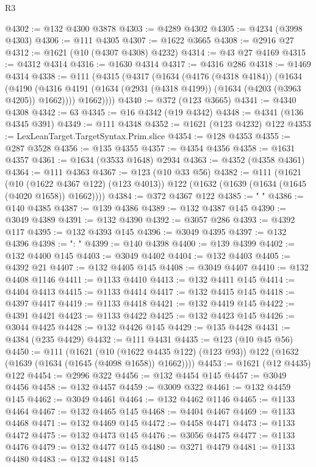 \begin{lexlean}{R3}
\begin{coremodule}
@4302 := @132 @4300 @3878
@4303 := @4289 @4302
@4305 := @4234 (@3998 @4303)
@4306 := @111 @4305
@4307 := @1622 @3665
@4308 := @2916 @27
@4312 := @1621 (@10 (@4307 @4308) @4232)
@4314 := @43 @27 @4169
@4315 := @4312 @4314
@4316 := @1630 @4314
@4317 := @4316 @286
@4318 := @1469 @4314
@4338 := @111
    (@4315
      (@4317
        (@1634
          (@4176 (@4318 @4184))
          (@1634
            (@4190 (@4316 @4191 (@1634 (@2931 (@4318 @4199)) (@1634 (@4203 (@3963 @4205)) @1662))))
            @1662))))
@4340 := @372 (@123 @3665)
@4341 := @4340 @4308
@4342 := 63
@4345 := @16 @4342 (@19 @4342)
@4348 := @4341 (@136 @4345 @391)
@4349 := @111 @4348
@4352 := @1621 (@123 @4232) @122
@4353 := LexLeanTarget.TargetSyntax.Prim.slice
@4354 := @128 @4353
@4355 := @287 @3528
@4356 := @135 @4355
@4357 := @4354 @4356
@4358 := @1631 @4357
@4361 := @1634 (@3533 @1648) @2934
@4363 := @4352 (@4358 @4361)
@4364 := @111 @4363
@4367 := @123 (@10 @33 @56)
@4382 := @111
    (@1621
      (@10 (@1622 @4367 @122) (@123 @4013))
      @122
      (@1632 (@1639 (@1634 (@1645 (@4020 @1658)) @1662))))
@4384 := @372 @4367 @122
@4385 := "      "
@4386 := @140 @4385
@4387 := @139 @4386
@4389 := @132 @4387 @145
@4390 := @3049 @4389
@4391 := @132 @4390
@4392 := @3057 @286
@4393 := @4392 @117
@4395 := @132 @4393 @145
@4396 := @3049 @4395
@4397 := @132 @4396
@4398 := ": "
@4399 := @140 @4398
@4400 := @139 @4399
@4402 := @132 @4400 @145
@4403 := @3049 @4402
@4404 := @132 @4403
@4405 := @4392 @21
@4407 := @132 @4405 @145
@4408 := @3049 @4407
@4410 := @132 @4408 @1146
@4411 := @1133 @4410
@4413 := @132 @4411 @145
@4414 := @4404 @4413
@4415 := @1133 @4414
@4417 := @132 @4415 @145
@4418 := @4397 @4417
@4419 := @1133 @4418
@4421 := @132 @4419 @145
@4422 := @4391 @4421
@4423 := @1133 @4422
@4425 := @132 @4423 @145
@4426 := @3044 @4425
@4428 := @132 @4426 @145
@4429 := @135 @4428
@4431 := @4384 (@235 @4429)
@4432 := @111 @4431
@4435 := @123 (@10 @45 @56)
@4450 := @111
    (@1621
      (@10 (@1622 @4435 @122) (@123 @93))
      @122
      (@1632 (@1639 (@1634 (@1645 (@4098 @1658)) @1662))))
@4453 := @1621 (@12 @4435) @122
@4454 := @2996 @322
@4456 := @132 @4454 @145
@4457 := @3049 @4456
@4458 := @132 @4457
@4459 := @3009 @322
@4461 := @132 @4459 @145
@4462 := @3049 @4461
@4464 := @132 @4462 @1146
@4465 := @1133 @4464
@4467 := @132 @4465 @145
@4468 := @4404 @4467
@4469 := @1133 @4468
@4471 := @132 @4469 @145
@4472 := @4458 @4471
@4473 := @1133 @4472
@4475 := @132 @4473 @145
@4476 := @3056 @4475
@4477 := @1133 @4476
@4479 := @132 @4477 @145
@4480 := @3271 @4479
@4481 := @1133 @4480
@4483 := @132 @4481 @145

\end{coremodule}
\end{lexlean}
